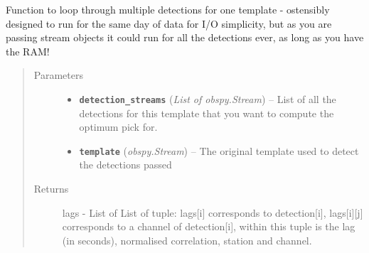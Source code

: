 \documentclass[a4paper,10pt,english]{sphinxmanual}
\begin{document}

\begin{fulllineitems}
\label{core:lag_calc.day_loop}
Function to loop through multiple detections for one template - ostensibly
designed to run for the same day of data for I/O simplicity, but as you
are passing stream objects it could run for all the detections ever, as long
as you have the RAM!
\begin{quote}\begin{description}
\item[{Parameters}] \leavevmode\begin{itemize}
\item {} 
\textbf{\texttt{detection\_streams}} (\emph{List of obspy.Stream}) -- List of all the detections for this template that you
want to compute the optimum pick for.

\item {} 
\textbf{\texttt{template}} (\emph{obspy.Stream}) -- The original template used to detect the detections passed

\end{itemize}

\item[{Returns}] \leavevmode
lags - List of List of tuple: lags{[}i{]} corresponds to detection{[}i{]},
lags{[}i{]}{[}j{]} corresponds to a channel of detection{[}i{]}, within
this tuple is the lag (in seconds), normalised correlation,
station and channel.

\end{description}\end{quote}

\end{fulllineitems}

\end{document}
